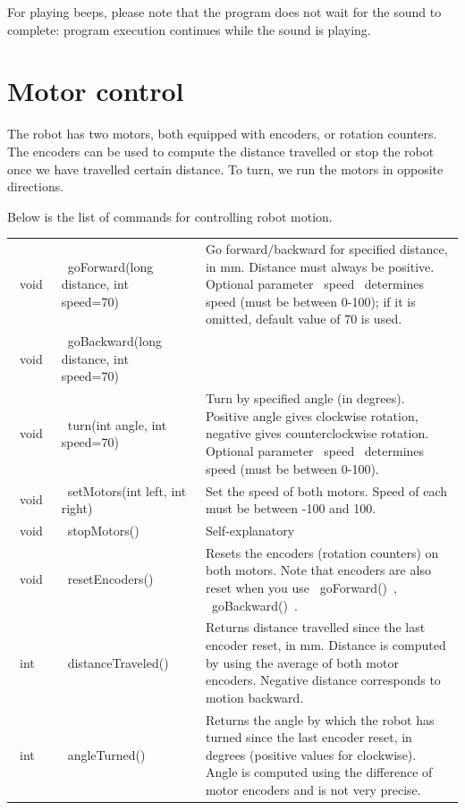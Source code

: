 \documentclass[oneside]{stml-l}
\numberwithin{figure}{chapter}
\begin{document}
For playing beeps, please note that the program does not wait for the sound to complete:
program execution continues while the sound is playing.


\section{Motor control}

The robot has two motors, both equipped with encoders, or rotation counters.
The encoders can be used to compute the distance travelled or stop the robot
once we have travelled certain distance. To turn, we run the motors in
opposite directions.

Below is the list of commands for controlling robot motion.

\par\noindent
\begin{tabular}{|l | l | p{7cm}|}
\hline
~void~ & ~goForward(long distance, int speed=70)~ & Go forward/backward
             for specified distance, in mm. Distance must always be positive.
             Optional parameter ~speed~ determines speed (must be between 0-100);
             if it is omitted, default value of 70 is used.
\\
\cline{1-2}
~void~ & ~goBackward(long distance, int speed=70)~ & \\
\hline
~void~ & ~turn(int angle, int speed=70)~ & Turn by specified angle (in degrees).
                  Positive angle gives clockwise rotation, negative gives counterclockwise
                  rotation. Optional parameter ~speed~ determines speed
                  (must be between 0-100).
\\
\hline
~void~ &~setMotors(int left, int right)~ & Set the speed of both motors.
                     Speed of each must be between -100 and 100.  \\
\hline
~void~ &~stopMotors()~ & Self-explanatory\\
\hline
~void~ &~resetEncoders()~ & Resets the encoders (rotation counters) on both motors.
                      Note that encoders are also reset when you
                      use ~goForward()~, ~goBackward()~. \\
\hline
~int~ & ~distanceTraveled()~& Returns distance travelled since the last
                encoder reset, in mm. Distance is computed by using the average
                of both motor encoders. Negative distance corresponds to motion backward. \\
\hline
~int~ & ~angleTurned()~& Returns the angle by which the robot has turned  since the last
                encoder reset, in degrees (positive values for clockwise). Angle  is computed
                using the difference of  motor encoders and is not very precise.  \\
\hline
\end{tabular}
\end{document}
